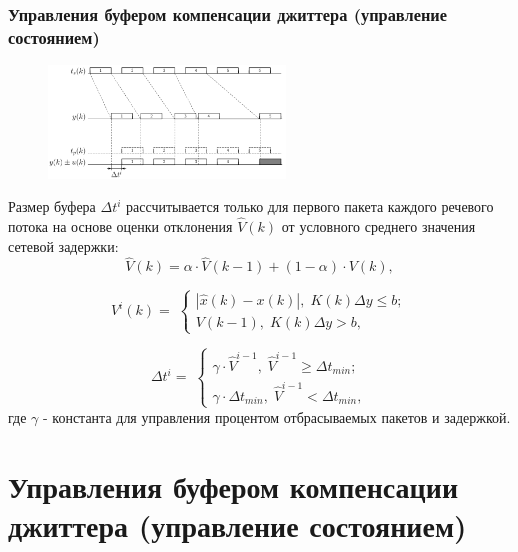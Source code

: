 \documentclass[10pt,pdf,hyperref={unicode}]{beamer}
\begin{document}
\begin{frame}
\frametitle{Управления буфером компенсации джиттера (управление состоянием)}

\begin{scriptsize}
\begin{figure}[!h]
\centering
\includegraphics[height=3cm]{timing_buffer.png}
\label{fig:man_5}
\end{figure}

Размер буфера $\Delta t^i$ рассчитывается только для первого пакета каждого речевого потока на основе оценки отклонения $\hat V (k)$ от условного среднего значения сетевой задержки:
\begin{equation}\label{eq41:syntes3}
\hat{V}(k)=\alpha\cdot\hat{V}(k-1)+(1-\alpha)\cdot V(k),
\end{equation}

\begin{equation}\label{eq41:syntes4}
V^i(k)= \;
\begin{cases}
| \hat{x}(k)-x(k) |, \; K(k)\Delta y \leq b; \\    
V(k-1), \;  K(k)\Delta y > b,    
\end{cases}
\end{equation}

\begin{equation}\label{eq41:syntes5}
\Delta t^i= \;
\begin{cases}
\gamma\cdot\hat{V}^{i-1}, \; \hat{V}^{i-1} \geq \Delta t_{min}; \\    
\gamma\cdot\Delta t_{min}, \;  \hat{V}^{i-1} < \Delta t_{min},    
\end{cases}
\end{equation}
\noindent где $\gamma$ - константа для управления процентом отбрасываемых пакетов и задержкой.
\end{scriptsize}

\end{frame}

\section{Управления буфером компенсации джиттера (управление состоянием)}
\end{document}
